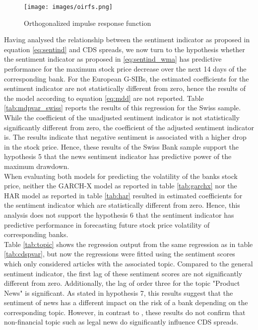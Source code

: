 \begin{figure}[H]
    \centering
    \texttt{[image: images/oirfs.png]}
    \caption{Orthogonalized impulse response function}
    \label{fig:oirfs}
\end{figure}


Having analysed the relationship between the sentiment indicator as proposed in equation \ref{eq:sentind} and CDS spreads, we now turn to the hypothesis whether the sentiment indicator as proposed in \ref{eq:sentind_wma} has predictive performance for the maximum stock price decrease over the next 14 days of the corresponding bank. For the European G-SIBs, the estimated coefficients for the sentiment indicator are not statistically different from zero, hence the results of the model according to equation \ref{eq:mdd} are not reported. Table \ref{tab:mdpvar_swiss} reports the results of this regression for the Swiss sample. While the coefficient of the unadjusted sentiment indicator is not statistically significantly different from zero, the coefficient of the adjusted sentiment indicator is. The results indicate that negative sentiment is associated with a higher drop in the stock price. Hence, these results of the Swiss Bank sample support the hypothesis 5 that the news sentiment indicator has predictive power of the maximum drawdown. \\



When evaluating both models for predicting the volatility of the banks stock price, neither the GARCH-X model as reported in table \ref{tab:garchx} nor the HAR model as reported in table \ref{tab:har} resulted in estimated coefficients for the sentiment indicator which are statistically different from zero. Hence, this analysis does not support the hypothesis 6 that the sentiment indicator has predictive performance in forecasting future stock price volatility of corresponding banks. \\





Table \ref{tab:topic} shows the regression output from the same regression as in table \ref{tab:cdspvar}, but now the regressions were fitted using the sentiment scores which only considered articles with the associated topic. Compared to the general sentiment indicator, the first lag of these sentiment scores are not significantly different from zero. Additionally, the lag of order three for the topic "Product News" is significant. As stated in hypothesis 7, this results suggest that the sentiment of news has a different impact on the risk of a bank depending on the corresponding topic. However, in contrast to \cite{roeder2020}, these results do not confirm that non-financial topic such as legal news do significantly influence CDS spreads.

